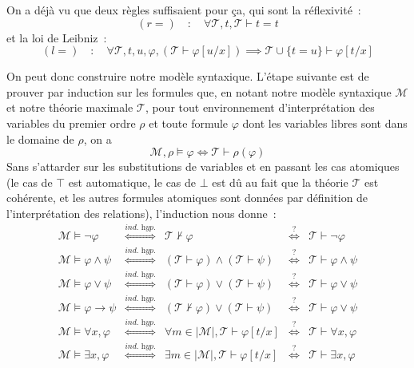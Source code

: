 On a déjà vu que deux règles suffisaient pour ça, qui sont la réflexivité~:
\[(\textit{r}=)\quad : \quad \forall \mathcal T, t, \mathcal T \vdash t = t\]
et la loi de Leibniz~:
\[(\textit{l}=)\quad : \quad \forall \mathcal T, t, u, \varphi,
(\mathcal T \vdash \varphi[u/x]) \implies
\mathcal T \cup\{ t = u \} \vdash \varphi[t/x]
\]

On peut donc construire notre modèle syntaxique. L'étape suivante est de prouver
par induction sur les formules que, en notant notre modèle syntaxique
$\mathcal M$ et notre théorie maximale $\mathcal T$, pour tout environnement
d'interprétation des variables du premier ordre $\rho$ et toute formule
$\varphi$ dont les variables libres sont dans le domaine de $\rho$, on a
\[\mathcal M, \rho \models \varphi \iff \mathcal T \vdash \rho(\varphi)\]
Sans s'attarder sur les substitutions de variables et en passant les cas
atomiques (le cas de $\top$ est automatique, le cas de $\bot$ est dû au fait
que la théorie $\mathcal T$ est cohérente, et les autres formules atomiques sont
données par définition de l'interprétation des relations), l'induction nous
donne~:
\[\begin{array}{ccccc}
\mathcal M \models \lnot \varphi 
& \overset{\textit{ind. hyp.}}{\iff} &
\mathcal T \nvdash \varphi & \overset{\text{?}}{\iff} &
\mathcal T \vdash \lnot\varphi \\
\mathcal M \models \varphi\land \psi
& \overset{\textit{ind. hyp.}}{\iff} &
(\mathcal T \vdash \varphi) \land (\mathcal T \vdash \psi)&
\overset{\text{?}}{\iff} &
\mathcal T \vdash \varphi \land \psi \\
\mathcal M \models \varphi\lor \psi
& \overset{\textit{ind. hyp.}}{\iff} &
(\mathcal T \vdash \varphi) \lor (\mathcal T \vdash \psi)&
\overset{\text{?}}{\iff} &
\mathcal T \vdash \varphi \lor \psi \\
\mathcal M \models \varphi\to \psi
& \overset{\textit{ind. hyp.}}{\iff} &
(\mathcal T \nvdash \varphi) \lor (\mathcal T \vdash \psi)&
\overset{\text{?}}{\iff} &
\mathcal T \vdash \varphi \lor \psi \\
\mathcal M \models \forall x, \varphi
& \overset{\textit{ind. hyp.}}{\iff} &
\forall m \in |\mathcal M |, \mathcal T \vdash \varphi[t/x]
& \overset{\text{?}}{\iff} &
\mathcal T \vdash \forall x, \varphi \\
\mathcal M \models \exists x, \varphi
& \overset{\textit{ind. hyp.}}{\iff} &
\exists m \in |\mathcal M |, \mathcal T \vdash \varphi[t/x]
& \overset{\text{?}}{\iff} &
\mathcal T \vdash \exists x, \varphi \\
\end{array}\]

